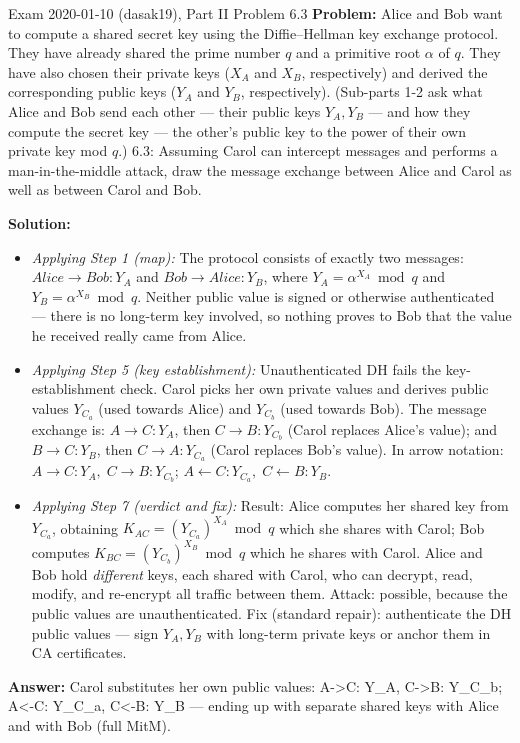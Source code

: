 \documentclass[12pt, a4paper]{article}
\begin{document}
\begin{practicebox}{Exam 2020-01-10 (dasak19), Part II Problem 6.3}
\textbf{Problem:} Alice and Bob want to compute a shared secret key using the Diffie--Hellman key exchange protocol. They have already shared the prime number $q$ and a primitive root $\alpha$ of $q$. They have also chosen their private keys ($X_A$ and $X_B$, respectively) and derived the corresponding public keys ($Y_A$ and $Y_B$, respectively). (Sub-parts 1-2 ask what Alice and Bob send each other --- their public keys $Y_A, Y_B$ --- and how they compute the secret key --- the other's public key to the power of their own private key mod $q$.) 6.3: Assuming Carol can intercept messages and performs a man-in-the-middle attack, draw the message exchange between Alice and Carol as well as between Carol and Bob.

\textbf{Solution:}
\begin{itemize}
    \item \textit{Applying Step 1 (map):} The protocol consists of exactly two messages: $Alice \to Bob : Y_A$ and $Bob \to Alice : Y_B$, where $Y_A = \alpha^{X_A} \bmod q$ and $Y_B = \alpha^{X_B} \bmod q$. Neither public value is signed or otherwise authenticated --- there is no long-term key involved, so nothing proves to Bob that the value he received really came from Alice.
    \item \textit{Applying Step 5 (key establishment):} Unauthenticated DH fails the key-establishment check. Carol picks her own private values and derives public values $Y_{C_a}$ (used towards Alice) and $Y_{C_b}$ (used towards Bob). The message exchange is: $A \to C : Y_A$, then $C \to B : Y_{C_b}$ (Carol replaces Alice's value); and $B \to C : Y_B$, then $C \to A : Y_{C_a}$ (Carol replaces Bob's value). In arrow notation: $A \to C : Y_A,\; C \to B : Y_{C_b}$; $A \leftarrow C : Y_{C_a},\; C \leftarrow B : Y_B$.
    \item \textit{Applying Step 7 (verdict and fix):} Result: Alice computes her shared key from $Y_{C_a}$, obtaining $K_{AC} = (Y_{C_a})^{X_A} \bmod q$ which she shares with Carol; Bob computes $K_{BC} = (Y_{C_b})^{X_B} \bmod q$ which he shares with Carol. Alice and Bob hold \emph{different} keys, each shared with Carol, who can decrypt, read, modify, and re-encrypt all traffic between them. Attack: possible, because the public values are unauthenticated. Fix (standard repair): authenticate the DH public values --- sign $Y_A, Y_B$ with long-term private keys or anchor them in CA certificates.
\end{itemize}
\textbf{Answer:} Carol substitutes her own public values: A->C: Y\_A, C->B: Y\_{C\_b}; A<-C: Y\_{C\_a}, C<-B: Y\_B --- ending up with separate shared keys with Alice and with Bob (full MitM).
\end{practicebox}
\end{document}
